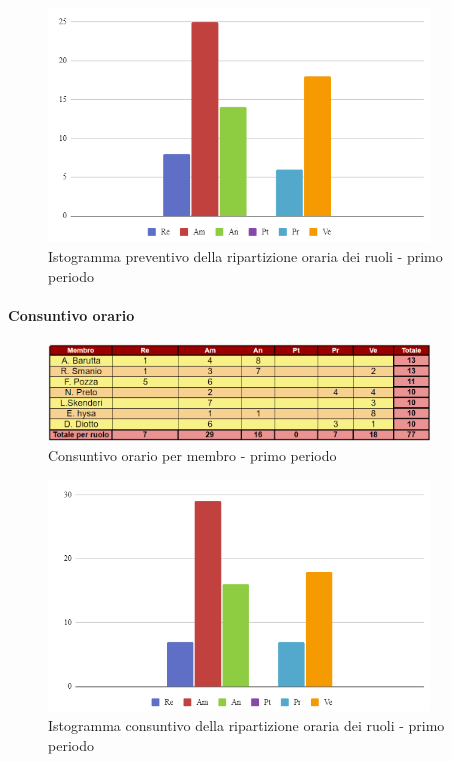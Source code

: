 \documentclass{article}
\begin{document}
\begin{figure}[h]
    \centering
    \includegraphics[width=0.9\textwidth]{../Images/preventivoDivisioneRuoli1Periodo.png}
    \caption{Istogramma preventivo della ripartizione oraria dei ruoli - primo periodo}
    \label{fig:PvD1}
\end{figure}





\paragraph{Consuntivo orario }

\begin{figure}[h]
    \centering
    \includegraphics[width=0.9\textwidth]{../Images/consuntivoOrario1Periodo.png}
    \caption{Consuntivo orario per membro - primo periodo}
    \label{fig:Cv1}
\end{figure}

\begin{figure}[h]
    \centering
    \includegraphics[width=0.9\textwidth]{../Images/consuntivoDivisioneRuoli1Periodo.png}
    \caption{Istogramma consuntivo della ripartizione oraria dei ruoli - primo periodo}
    \label{fig:PvD1}
\end{figure}
\end{document}
